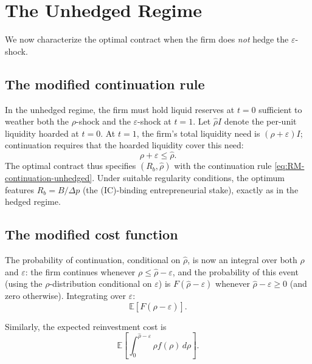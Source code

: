 \documentclass[11pt,a4paper,oneside]{book}
\def\E{\mathbb{E}}
\def\leq{\leqslant}
\def\geq{\geqslant}
\theoremstyle{plain}
\theoremstyle{definition}
\theoremstyle{remark}
\numberwithin{equation}{chapter}
\begin{document}
\section{The Unhedged Regime}
\label{sec:RM-unhedged}

We now characterize the optimal contract when the firm does \emph{not} hedge the $\varepsilon$-shock.

\subsection{The modified continuation rule}

In the unhedged regime, the firm must hold liquid reserves at $t=0$ sufficient to weather both the $\rho$-shock and the $\varepsilon$-shock at $t=1$.
Let $\widehat{\rho} I$ denote the per-unit liquidity hoarded at $t=0$.
At $t=1$, the firm's total liquidity need is $(\rho + \varepsilon) I$; continuation requires that the hoarded liquidity cover this need:
\begin{equation}\label{eq:RM-continuation-unhedged}
  \rho + \varepsilon \leq \widehat{\rho}.
\end{equation}
The optimal contract thus specifies $(R_b, \widehat{\rho})$ with the continuation rule \eqref{eq:RM-continuation-unhedged}.
Under suitable regularity conditions, the optimum features $R_b = B/\Delta p$ (the (IC)-binding entrepreneurial stake), exactly as in the hedged regime.

\subsection{The modified cost function}

The probability of continuation, conditional on $\widehat{\rho}$, is now an integral over both $\rho$ and $\varepsilon$: the firm continues whenever $\rho \leq \widehat{\rho} - \varepsilon$, and the probability of this event (using the $\rho$-distribution conditional on $\varepsilon$) is $F(\widehat{\rho} - \varepsilon)$ whenever $\widehat{\rho} - \varepsilon \geq 0$ (and zero otherwise).
Integrating over $\varepsilon$:
\begin{equation}\label{eq:RM-prob-cont}
  \E[F(\widehat{\rho} - \varepsilon)].
\end{equation}

Similarly, the expected reinvestment cost is
\begin{equation}\label{eq:RM-expected-reinvest}
  \E \left[ \int_0^{\widehat{\rho} - \varepsilon} \rho f(\rho) \, d\rho \right].
\end{equation}
\end{document}
